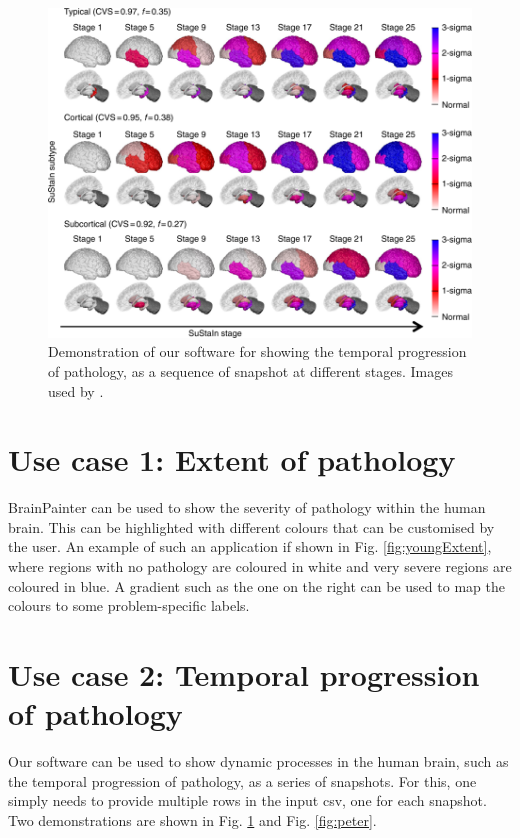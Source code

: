 \documentclass{llncs}
\begin{document}
\begin{figure}[htp]
\centering
 \includegraphics[width=1\textwidth, trim=20 0 0 220, clip]{images/young_progression.png}
 \caption{Demonstration of our software for showing the temporal progression of pathology, as a sequence of snapshot at different stages. Images used by \cite{young2018uncovering}.}
  \label{fig:youngProg}
\end{figure}

\section{Use case 1: Extent of pathology}
\label{extent}

BrainPainter can be used to show the severity of pathology within the human brain. This can be highlighted with different colours that can be customised by the user. An example of such an application if shown in Fig. \ref{fig:youngExtent}, where regions with no pathology are coloured in white and very severe regions are coloured in blue. A gradient such as the one on the right can be used to map the colours to some problem-specific labels.




\section{Use case 2: Temporal progression of pathology}
\label{progression}

Our software can be used to show dynamic processes in the human brain, such as the temporal progression of pathology, as a series of snapshots. For this, one simply needs to provide multiple rows in the input csv, one for each snapshot. Two demonstrations are shown in Fig. \ref{fig:youngProg} and Fig. \ref{fig:peter}.
\end{document}
